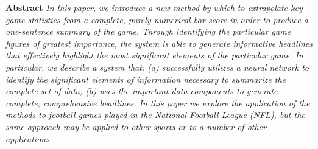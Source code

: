 \documentclass[12pt, journal]{IEEEtran}
\begin{document}







\maketitle








%
\IEEEpeerreviewmaketitle


\textbf{Abstract }\textit{In this paper, we introduce a new method by which to extrapolate key game statistics from a complete, purely numerical box score in order to produce a one-sentence summary of the game. Through identifying the particular game figures of greatest importance, the system is able to generate informative headlines that effectively highlight the most significant elements of the particular game. In particular, we describe a system that: (a) successfully utilizes a neural network to identify the significant elements of information necessary to summarize the complete set of data; (b) uses the important data components to generate complete, comprehensive headlines. In this paper we explore the application of the methods to football games played in the National Football League (NFL), but the same approach may be applied to other sports or to a number of other applications. }
\end{document}
